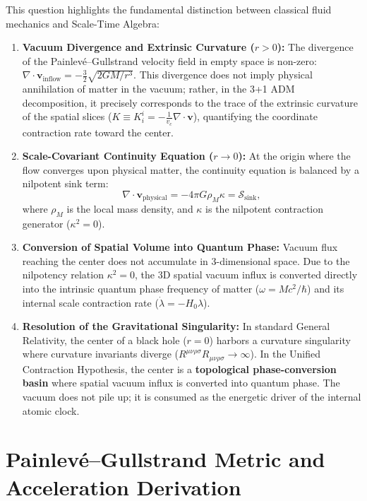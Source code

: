 \documentclass[11pt,a4paper]{article}
\begin{document}
This question highlights the fundamental distinction between classical fluid mechanics and Scale-Time Algebra:

\begin{enumerate}
    \item \textbf{Vacuum Divergence and Extrinsic Curvature ($r > 0$):} The divergence of the Painlevé--Gullstrand velocity field in empty space is non-zero: $\nabla \cdot \mathbf{v}_{\mathrm{inflow}} = -\frac{3}{2}\sqrt{2GM/r^3}$. This divergence does not imply physical annihilation of matter in the vacuum; rather, in the 3+1 ADM decomposition, it precisely corresponds to the trace of the extrinsic curvature of the spatial slices ($K \equiv K^i_i = -\frac{1}{v_c}\nabla\cdot\mathbf{v}$), quantifying the coordinate contraction rate toward the center.
    \item \textbf{Scale-Covariant Continuity Equation ($r \to 0$):} At the origin where the flow converges upon physical matter, the continuity equation is balanced by a nilpotent sink term:
          \begin{equation}
              \nabla \cdot \mathbf{v}_{\mathrm{physical}} = -4\pi G \rho_M \kappa = \mathcal{S}_{\mathrm{sink}},
              \label{eq:sureklilik_denklemi}
          \end{equation}
          where $\rho_M$ is the local mass density, and $\kappa$ is the nilpotent contraction generator ($\kappa^2 = 0$).
    \item \textbf{Conversion of Spatial Volume into Quantum Phase:} Vacuum flux reaching the center does not accumulate in 3-dimensional space. Due to the nilpotency relation $\kappa^2 = 0$, the 3D spatial vacuum influx is converted directly into the intrinsic quantum phase frequency of matter ($\omega = M c^2 / \hbar$) and its internal scale contraction rate ($\dot{\lambda} = -H_0 \lambda$).
    \item \textbf{Resolution of the Gravitational Singularity:} In standard General Relativity, the center of a black hole ($r=0$) harbors a curvature singularity where curvature invariants diverge ($R^{\mu\nu\rho\sigma} R_{\mu\nu\rho\sigma} \to \infty$). In the Unified Contraction Hypothesis, the center is a \textbf{topological phase-conversion basin} where spatial vacuum influx is converted into quantum phase. The vacuum does not pile up; it is consumed as the energetic driver of the internal atomic clock.
\end{enumerate}

\section{Painlev\'e--Gullstrand Metric and Acceleration Derivation}
\label{sec:ivme}
\end{document}
